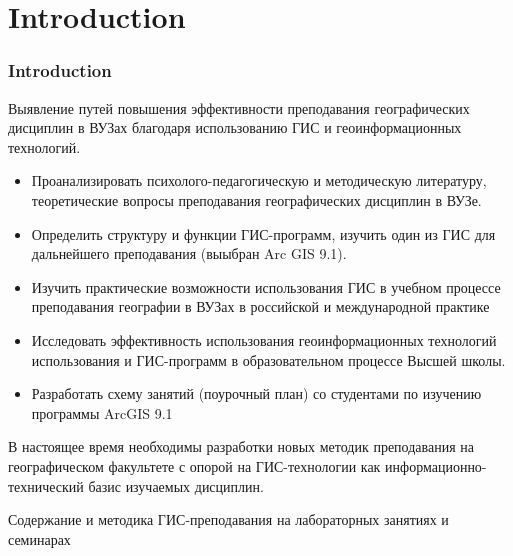 \documentclass[pdflatex,compress,8pt,
	xcolor={dvipsnames,dvipsnames,svgnames,x11names,table},
	hyperref={	 
	pdfauthor={Lemenkova Polina}, 
	pdfsubject={Preentation}, 
	pdfcreator={Lemenkova Polina}, 
	pdfproducer={Lemenkova Polina}, 
	colorlinks=true,
	linkcolor=Red3, 
	citecolor=NavyBlue, 
	urlcolor = NavyBlue, 
	breaklinks = true}]{beamer}
\begin{document}
\section{Introduction}
\begin{frame}\frametitle{Introduction}

\small{
\begin{block}{}
Выявление путей повышения эффективности преподавания географических дисциплин в ВУЗах благодаря использованию ГИС и геоинформационных технологий.
\end{block}

\begin{alertblock}{}
\begin{itemize}
	\item Проанализировать психолого-педагогическую и методическую литературу, теоретические вопросы преподавания географических дисциплин в ВУЗе.
	\item Определить структуру и функции ГИС-программ, изучить один из ГИС для дальнейшего преподавания (выыбран Arc GIS 9.1).
	\item Изучить практические возможности использования ГИС в учебном процессе преподавания географии в ВУЗах в российской и международной практике
	\item Исследовать эффективность использования геоинформационных технологий использования и ГИС-программ в образовательном процессе Высшей школы.
	\item Разработать схему занятий (поурочный план) со студентами по изучению программы ArcGIS 9.1
\end{itemize}
\end{alertblock}

\begin{alertblock}{}
В настоящее время необходимы разработки новых методик преподавания на географическом факультете с опорой на ГИС-технологии как информационно-технический базис изучаемых дисциплин.
\end{alertblock}

\begin{block}{}
Содержание и методика ГИС-преподавания на лабораторных занятиях и семинарах 
\end{block}
}
\end{frame}
\end{document}
